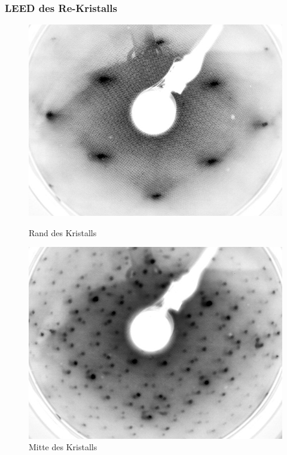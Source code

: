 \documentclass{beamer}
\begin{document}
\begin{frame}
\frametitle{LEED des Re-Kristalls}
\begin{figure}[htbp]
	\begin{minipage}[b]{0.45\textwidth}
	\includegraphics[width=\textwidth]{bilder/unbedampft_E207}
	\caption*{Rand des Kristalls}
	\end{minipage}
	\hspace{0.2cm}
	\begin{minipage}[b]{0.45\textwidth}
	\includegraphics[width=\textwidth]{bilder/unbedampft_E207_MitteKristall.jpg}
	\caption*{Mitte des Kristalls}
	\end{minipage}
\end{figure}
\end{frame}
\end{document}
